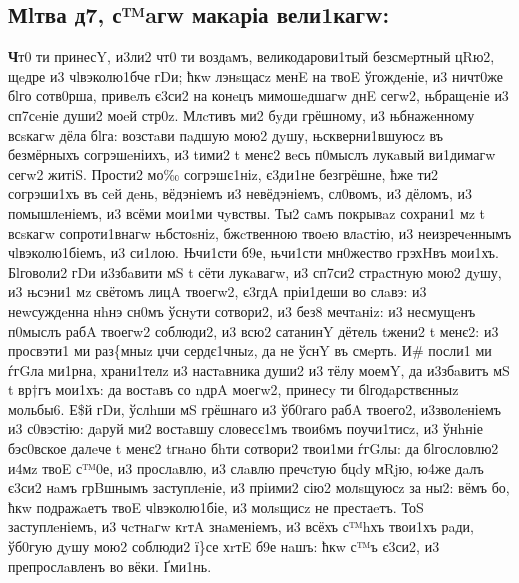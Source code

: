 \subsection{Мlтва д7, с™aгw макaріа
    вели1кагw:}

\textbf{Ч}т0 ти принесY, и3ли2 чт0 ти воздaмъ, великодарови1тый безсмeртный цRю2,
щeдре и3 чlвэколю1бче гDи; ћкw лэнsщасz менE на твоE ўгождeніе, и3
ничт0же бlго сотв0рша, привeлъ є3си2 на конeцъ мимошeдшагw днE сегw2,
њбращeніе и3 сп7сeніе души2 моeй стр0z. Млcтивъ ми2 бyди грёшному, и3
њбнажeнному всsкагw дёла бlга: возстaви пaдшую мою2 дyшу,
њскверни1вшуюсz въ безмёрныхъ согрэшeніихъ, и3 tими2 t менє2 вeсь
п0мыслъ лукaвый ви1димагw сегw2 житіS. Прости2 мо‰ согрэшє1ніz, є3ди1не
безгрёшне, ћже ти2 согрэши1хъ въ сeй дeнь, вёдэніемъ и3 невёдэніемъ,
сл0вомъ, и3 дёломъ, и3 помышлeніемъ, и3 всёми мои1ми чyвствы. Ты2 сaмъ
покрывaz сохрани1 мz t всsкагw сопроти1внагw њбстоsніz, бжcтвенною твоeю
влaстію, и3 неизречeннымъ чlвэколю1біемъ, и3 си1лою. Њчи1сти б9е,
њчи1сти мн0жество грэхHвъ мои1хъ. Бlговоли2 гDи и3збaвити мS t сёти
лукaвагw, и3 сп7си2 стрaстную мою2 дyшу, и3 њсэни1 мz свётомъ лицA
твоегw2, є3гдA пріи1деши во слaвэ: и3 неwсуждeнна нhнэ сн0мъ ўснyти
сотвори2, и3 без8 мечтaніz: и3 несмущeнъ п0мыслъ рабA твоегw2 соблюди2,
и3 всю2 сатанинY дётель tжени2 t менє2: и3 просвэти1 ми раз\{мныz џчи
сердє1чныz, да не ўснY въ смeрть. И\# посли1 ми ѓгGла ми1рна, храни1телz
и3 настaвника души2 и3 тёлу моемY, да и3збaвитъ мS t вр†гъ мои1хъ: да
востaвъ со nдрA моегw2, принесy ти бlгодaрствєнныz мольбы6. Е\$й гDи,
ўслhши мS грёшнаго и3 ўб0гаго рабA твоего2, и3зволeніемъ и3 с0вэстію:
дaруй ми2 востaвшу словесє1мъ твои6мъ поучи1тисz, и3 ўнhніе бэс0вское
далeче t менє2 tгнaно бhти сотвори2 твои1ми ѓгGлы: да бlгословлю2 и4мz
твоE с™0е, и3 прослaвлю, и3 слaвлю пречcтую бцdу мRjю, ю4же дaлъ є3си2
нaмъ грBшнымъ заступлeніе, и3 пріими2 сію2 молsщуюсz за ны2: вёмъ бо,
ћкw подражaетъ твоE чlвэколю1біе, и3 молsщисz не престаeтъ. ТоS
заступлeніемъ, и3 чcтнaгw кrтA знaменіемъ, и3 всёхъ с™hхъ твои1хъ рaди,
ўб0гую дyшу мою2 соблюди2 ї\}се хrтE б9е нaшъ: ћкw с™ъ є3си2, и3
препрослaвленъ во вёки. Ґми1нь.
